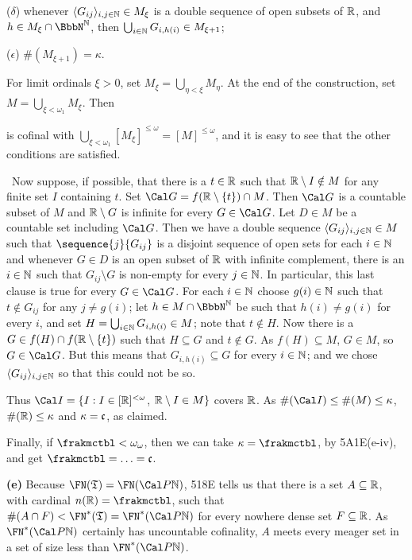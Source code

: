 {{($\delta$) whenever $\langle G_{ij}\rangle_{i,j\in\Bbb N}\in M_{\xi}$ is
a double sequence of open subsets of $\Bbb R$, and
$h\in M_{\xi}\cap\NN$, then
$\bigcup_{i\in\Bbb N}G_{i,h(i)}\in M_{\xi+1}$;

($\epsilon$) $\#(M_{\xi+1})=\kappa$.}

\noindent For limit ordinals $\xi>0$, set
$M_{\xi}=\bigcup_{\eta<\xi}M_{\eta}$.   At the end of the construction,
set $M=\bigcup_{\xi<\omega_1}M_{\xi}$.   Then


\noindent is cofinal with
$\bigcup_{\xi<\omega_1}[M_{\xi}]^{\le\omega}=[M]^{\le\omega}$, and it is
easy to see that the other conditions are satisfied.\ \Qed

\medskip

 \Quer\ Now suppose, if possible, that there is a
$t\in\Bbb R$ such that $\Bbb R\setminus I\notin M$ for any finite set
$I$ containing $t$.   Set $\Cal G=f(\Bbb R\setminus\{t\})\cap M$.
Then $\Cal G$ is a countable subset of
$M$ and $\Bbb R\setminus G$ is infinite for every $G\in\Cal G$.   Let
$D\in M$ be a countable set including $\Cal G$.   Then we have a double
sequence $\langle G_{ij}\rangle_{i,j\in\Bbb N}\in M$ such that
$\sequence{j}{G_{ij}}$ is a disjoint sequence of open sets for each $i\in\Bbb N$ and whenever
$G\in D$ is an open subset of $\Bbb R$ with infinite complement, there
is an $i\in\Bbb N$ such that $G_{ij}\setminus G$ is non-empty for every
$j\in\Bbb N$.   In particular, this last clause is true for every
$G\in\Cal G$.   For each $i\in\Bbb N$ choose $g(i)\in\Bbb N$ such that
$t\notin G_{ij}$ for any $j\ne g(i)$;   let $h\in M\cap\NN$ be such that
$h(i)\ne g(i)$ for every $i$, and set
$H=\bigcup_{i\in\Bbb N}G_{i,h(i)}\in M$;  note that $t\notin H$.   Now
there is a
$G\in f(H)\cap f(\Bbb R\setminus\{t\})$ such that
$H\subseteq G$ and $t\notin G$.   As $f(H)\subseteq M$,
$G\in M$, so $G\in\Cal G$.   But this means that $G_{i,h(i)}\subseteq G$ for every
$i\in\Bbb N$;  and we chose $\langle G_{ij}\rangle_{i,j\in\Bbb N}$ so
that this could not be so.\ \Bang

Thus $\Cal I=\{I:I\in[\Bbb R]^{<\omega}$, $\Bbb R\setminus I\in M\}$
covers $\Bbb R$.   As $\#(\Cal I)\le\#(M)\le\kappa$,
$\#(\Bbb R)\le\kappa$ and $\kappa=\frak c$, as claimed.

\medskip

 Finally, if $\frakmctbl<\omega_{\omega}$, then we can
take $\kappa=\frakmctbl$, by 5A1E(e-iv),
and get $\frakmctbl=\ldots=\frak c$.

\medskip

{\bf (e)} Because $\FN(\frak T)=\FN(\Cal P\Bbb N)$, 518E tells us that
there is a set $A\subseteq\Bbb R$, with cardinal $n(\Bbb R)=\frakmctbl$, 
such that
$\#(A\cap F)<\FN^*(\frak T)=\FN^*(\Cal P\Bbb N)$ for every nowhere dense
set $F\subseteq\Bbb R$.   As $\FN^*(\Cal P\Bbb N)$ certainly has
uncountable cofinality, $A$ meets every meager set in a set of size less
than $\FN^*(\Cal P\Bbb N)$.
}%


